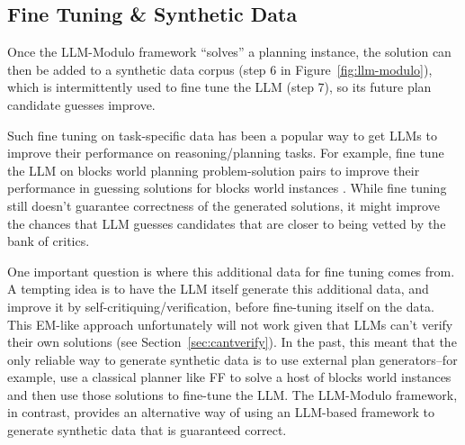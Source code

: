 \subsection{Fine Tuning \& Synthetic Data}
\label{sec:syntheticdata}


Once the LLM-Modulo framework ``solves'' a planning instance, the solution can then be added to a synthetic data corpus (step 6 in Figure~\ref{fig:llm-modulo}), which is intermittently used to fine tune the LLM (step 7), so its future plan candidate guesses improve. 

Such fine tuning on task-specific data has been a  popular way to get LLMs to improve their performance on reasoning/planning tasks. For example, fine tune the LLM on blocks world planning problem-solution pairs to improve their performance in guessing solutions for blocks world instances
\cite{pallagani2023understanding}. While fine tuning still doesn't guarantee correctness of the generated solutions, it might improve the chances that LLM guesses candidates that are closer to being vetted by the bank of critics. 

One important question is where this additional data for fine tuning comes from. A tempting idea is to have the LLM itself generate this additional data, and improve it by self-critiquing/verification, before fine-tuning itself on the data. This EM-like approach unfortunately will not work given that LLMs can't verify their own solutions (see Section~\ref{sec:cantverify}). In the past, this meant that the only reliable way to generate synthetic data is to use external plan generators--for example, use a classical planner like FF \cite{hoffmann2001ff} to solve a host of blocks world instances and then use those solutions to fine-tune the LLM. 
%
The LLM-Modulo framework, in contrast, provides an alternative way of using an LLM-based framework to generate synthetic data that is guaranteed correct. 



